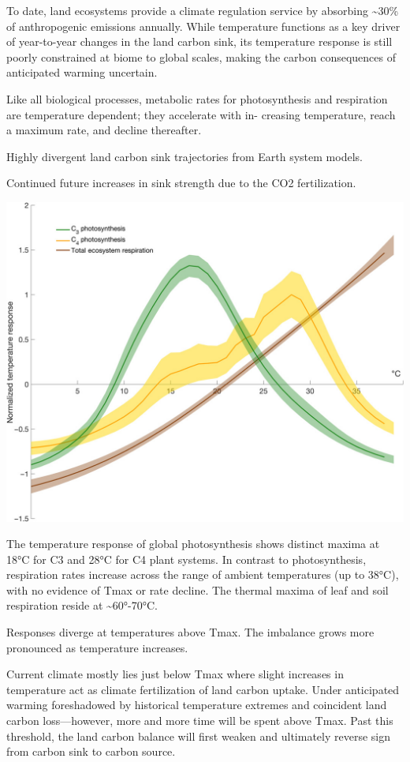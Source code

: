 \documentclass[
]{book}
\begin{document}
To date, land ecosystems provide a climate regulation service
by absorbing \textasciitilde30\% of anthropogenic emissions annually.
While temperature functions as a key driver
of year-to-year changes in the land carbon sink,
its temperature response is still poorly constrained at biome to global scales,
making the carbon consequences of anticipated warming uncertain.

Like all biological processes, metabolic rates for photosynthesis
and respiration are temperature dependent; they accelerate with in-
creasing temperature, reach a maximum rate, and decline thereafter.

Highly divergent land carbon sink trajectories from Earth system models.

Continued future increases in sink strength due to the CO2 fertilization.

\includegraphics{fig/Photosythesis_Temp_Response.jpg}

The temperature response of global photosynthesis
shows distinct maxima at 18°C for C3 and 28°C for C4 plant systems.
In contrast to photosynthesis, respiration rates increase across
the range of ambient temperatures (up to 38°C),
with no evidence of Tmax or rate decline.
The thermal maxima of leaf and soil respiration reside at \textasciitilde60°-70°C.

Responses diverge at temperatures above Tmax.
The imbalance grows more pronounced as temperature increases.

Current climate mostly lies just below Tmax where slight increases in temperature act as
climate fertilization of land carbon uptake.
Under anticipated warming foreshadowed by historical temperature extremes and coincident
land carbon loss---however, more and more time will be spent above Tmax.
Past this threshold, the land carbon balance will first weaken and
ultimately reverse sign from carbon sink to carbon source.
\end{document}
